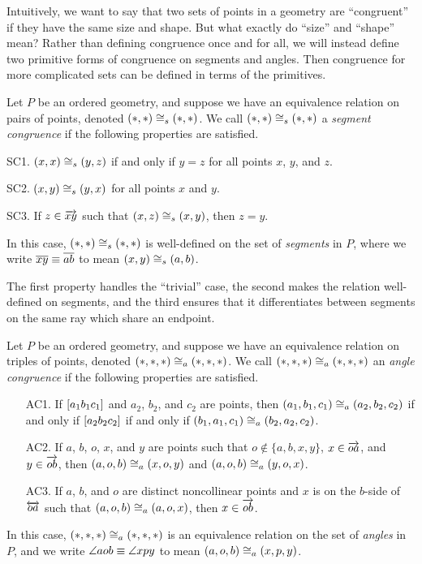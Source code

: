 Intuitively, we want to say that two sets of points in a geometry are ``congruent'' if they have the same size and shape.
But what exactly do ``size'' and ``shape'' mean?
Rather than defining congruence once and for all, we will instead define two primitive forms of congruence on segments and angles.
Then congruence for more complicated sets can be defined in terms of the primitives.

\begin{dfn}
Let \(P\) be an ordered geometry, and suppose we have an equivalence relation on pairs of points, denoted \((\ast,\ast) \cong_s (\ast,\ast)\).
We call \((\ast,\ast) \cong_s (\ast,\ast)\) a \emph{segment congruence} if the following properties are satisfied.
\begin{proplist}
\item[SC1.] \((x,x) \cong_s (y,z)\) if and only if \(y = z\) for all points \(x\), \(y\), and \(z\).
\item[SC2.] \((x,y) \cong_s (y,x)\) for all points \(x\) and \(y\).
\item[SC3.] If \(z \in \overrightarrow{xy}\) such that \((x,z) \cong_s (x,y)\), then \(z = y\).
\end{proplist}
In this case, \((\ast,\ast) \cong_s (\ast,\ast)\) is well-defined on the set of \emph{segments} in \(P\), where we write \(\overline{xy} \equiv \overline{ab}\) to mean \((x,y) \cong_s (a,b)\).
\end{dfn}

The first property handles the ``trivial'' case, the second makes the relation well-defined on segments, and the third ensures that it differentiates between segments on the same ray which share an endpoint.

\begin{dfn}
Let \(P\) be an ordered geometry, and suppose we have an equivalence relation on triples of points, denoted \((\ast,\ast,\ast) \cong_a (\ast,\ast,\ast)\).
We call \((\ast,\ast,\ast) \cong_a (\ast,\ast,\ast)\) an \emph{angle congruence} if the following properties are satisfied.
\begin{itemize}
\item[AC1.] If \([ a_1 b_1 c_1 ]\) and \(a_2\), \(b_2\), and \(c_2\) are points, then \((a_1,b_1,c_1) \cong_a (a_2,b_2,c_2)\) if and only if \([ a_2 b_2 c_2 ]\) if and only if \((b_1,a_1,c_1) \cong_a (b_2,a_2,c_2)\).
\item[AC2.] If \(a\), \(b\), \(o\), \(x\), and \(y\) are points such that \(o \notin \{a,b,x,y\}\), \(x \in \overrightarrow{oa}\), and \(y \in \overrightarrow{ob}\), then \((a,o,b) \cong_a (x,o,y)\) and \((a,o,b) \cong_a (y,o,x)\).
\item[AC3.] If \(a\), \(b\), and \(o\) are distinct noncollinear points and \(x\) is on the \(b\)-side of \(\overleftrightarrow{oa}\) such that \((a,o,b) \cong_a (a,o,x)\), then \(x \in \overrightarrow{ob}\).
\end{itemize}
In this case, \((\ast,\ast,\ast) \cong_a (\ast,\ast,\ast)\) is an equivalence relation on the set of \emph{angles} in \(P\), and we write \(\angle{aob} \equiv \angle{xpy}\) to mean \((a,o,b) \cong_a (x,p,y)\).
\end{dfn}

